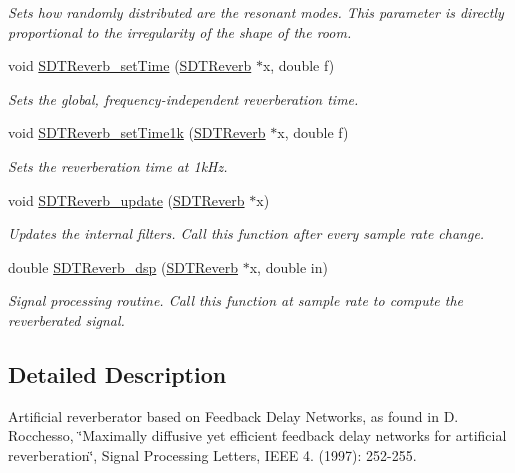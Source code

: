 \begin{DoxyCompactItemize}
\begin{DoxyCompactList}\small\item\em Sets how randomly distributed are the resonant modes. This parameter is directly proportional to the irregularity of the shape of the room. \end{DoxyCompactList}\item 
void \hyperlink{group__reverb_gab0c497984a8bc2aa26f0e030401b5758}{S\+D\+T\+Reverb\+\_\+set\+Time} (\hyperlink{group__reverb_ga572fe1bba384610f4d05431c8f2bed73}{S\+D\+T\+Reverb} $\ast$x, double f)
\begin{DoxyCompactList}\small\item\em Sets the global, frequency-\/independent reverberation time. \end{DoxyCompactList}\item 
void \hyperlink{group__reverb_ga096895486faa57d1741050abbe8f5084}{S\+D\+T\+Reverb\+\_\+set\+Time1k} (\hyperlink{group__reverb_ga572fe1bba384610f4d05431c8f2bed73}{S\+D\+T\+Reverb} $\ast$x, double f)
\begin{DoxyCompactList}\small\item\em Sets the reverberation time at 1k\+Hz. \end{DoxyCompactList}\item 
\hypertarget{group__reverb_ga45b224ccc8e69decae90e47e22d729b9}{}void \hyperlink{group__reverb_ga45b224ccc8e69decae90e47e22d729b9}{S\+D\+T\+Reverb\+\_\+update} (\hyperlink{group__reverb_ga572fe1bba384610f4d05431c8f2bed73}{S\+D\+T\+Reverb} $\ast$x)\label{group__reverb_ga45b224ccc8e69decae90e47e22d729b9}

\begin{DoxyCompactList}\small\item\em Updates the internal filters. Call this function after every sample rate change. \end{DoxyCompactList}\item 
double \hyperlink{group__reverb_ga8e4c33e0dff5f7f106dc003f1a0c6efa}{S\+D\+T\+Reverb\+\_\+dsp} (\hyperlink{group__reverb_ga572fe1bba384610f4d05431c8f2bed73}{S\+D\+T\+Reverb} $\ast$x, double in)
\begin{DoxyCompactList}\small\item\em Signal processing routine. Call this function at sample rate to compute the reverberated signal. \end{DoxyCompactList}\end{DoxyCompactItemize}


\subsection{Detailed Description}
Artificial reverberator based on Feedback Delay Networks, as found in D. Rocchesso, \char`\"{}\+Maximally diffusive yet efficient feedback delay networks
for artificial reverberation\char`\"{}, Signal Processing Letters, I\+E\+E\+E 4. (1997)\+: 252-\/255. 

